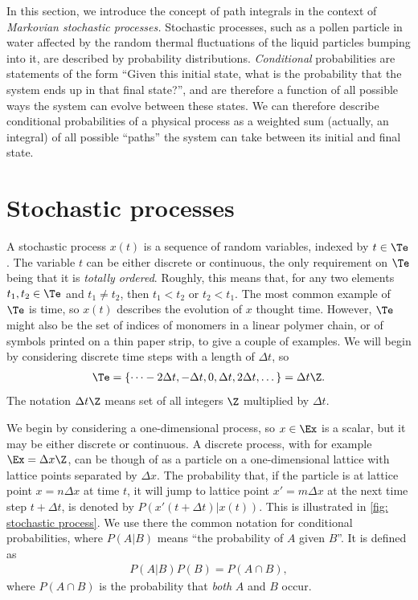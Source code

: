 In this section, we introduce the concept of path integrals in the context of \emph{Markovian stochastic processes.}
Stochastic processes, such as a pollen particle in water affected by the random thermal fluctuations of the liquid particles bumping into it, are described by probability distributions.
\emph{Conditional} probabilities are statements of the form ``Given this initial state, what is the probability that the system ends up in that final state?'', and are therefore a function of all possible ways the system can evolve between these states.
We can therefore describe conditional probabilities of a physical process as a weighted sum (actually, an integral) of all possible ``paths'' the system can take between its initial and final state.


\section{Stochastic processes}

A stochastic process $x(t)$ is a sequence of random variables, indexed by $t \in \Te$.
The variable $t$ can be either discrete or continuous, the only requirement on $\Te$ being that it is \emph{totally ordered}.
Roughly, this means that, for any two elements $t_1, t_2 \in \Te$ and $t_1 \neq t_2$, then $t_1 < t_2$ or $t_2 < t_1$.
The most common example of $\Te$ is time, so $x(t)$ describes the evolution of $x$ thought time.
However, $\Te$ might also be the set of indices of monomers in a linear polymer chain, or of symbols printed on a thin paper strip, to give a couple of examples.
We will begin by considering discrete time steps with a length of $\Delta t$, so
%
\begin{align}
    \Te = \{ \dots -2 \Delta t, - \Delta t, 0, \Delta t, 2 \Delta t, \dots\} = \Delta t \Z.
\end{align}
%
The notation $\Delta t \Z$ means set of all integers $\Z$ multiplied by $\Delta t$.

We begin by considering a one-dimensional process, so $x \in \Ex$ is a scalar, but it may be either discrete or continuous.
A discrete process, with for example $\Ex = \Delta x \Z$, can be though of as a particle on a one-dimensional lattice with lattice points separated by $\Delta x$.
The probability that, if the particle is at lattice point $x = n \Delta x$ at time $t$, it will jump to lattice point $x' = m \Delta x$ at the next time step $t + \Delta t$, is denoted by $P\left(x'(t + \Delta t) | x(t) \right)$.
This is illustrated in \autoref{fig: stochastic process}.
We use there the common notation for conditional probabilities, where $P(A|B)$ means ``the probability of $A$ given $B$''.
It is defined as 
%
\begin{align}\label{eq: cond prob}
    P(A|B) P(B) = P(A\cap B),
\end{align}
%
where $P(A\cap B)$ is the probability that \emph{both} $A$ and $B$ occur.


